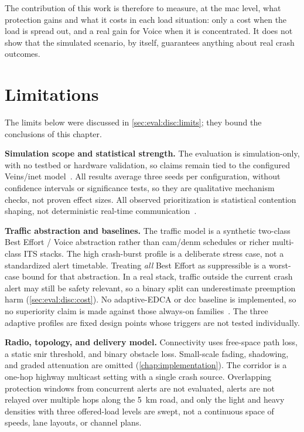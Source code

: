 The contribution of this work is therefore to measure, at the \gls{mac} level, what protection gains and what it costs in each load situation: only a cost when the load is spread out, and a real gain for Voice when it is concentrated.
It does not show that the simulated scenario, by itself, guarantees anything about real crash outcomes.

\section{Limitations}
\label{sec:conc:limits}

The limits below were discussed in \autoref{sec:eval:disc:limits}; they bound the conclusions of this chapter.

\noindent\textbf{Simulation scope and statistical strength.}
The evaluation is simulation-only, with no testbed or hardware validation, so claims remain tied to the configured Veins/\gls{inet} model~\cite{aguiar2026_veins_qos}.
All results average three seeds per configuration, without confidence intervals or significance tests, so they are qualitative mechanism checks, not proven effect sizes.
All observed prioritization is statistical contention shaping, not deterministic real-time communication~\cite{kosekszott2012What}.

\medskip
\noindent\textbf{Traffic abstraction and baselines.}
The traffic model is a synthetic two-class Best Effort / Voice abstraction rather than \gls{cam}/\gls{denm} schedules or richer multi-class ITS stacks.
The high crash-burst profile is a deliberate stress case, not a standardized alert timetable.
Treating \emph{all} Best Effort as suppressible is a worst-case bound for that abstraction.
In a real stack, traffic outside the current crash alert may still be safety relevant, so a binary split can underestimate preemption harm (\autoref{sec:eval:disc:cost}).
No adaptive-EDCA or \gls{dcc} baseline is implemented, so no superiority claim is made against those always-on families~\cite{etsi_dcc_2018,romdhani2003AdaptiveEDCF}.
The three adaptive profiles are fixed design points whose triggers are not tested individually.

\medskip
\noindent\textbf{Radio, topology, and delivery model.}
Connectivity uses free-space path loss, a static \gls{snir} threshold, and binary obstacle loss.
Small-scale fading, shadowing, and graded attenuation are omitted (\autoref{chap:implementation}).
The corridor is a one-hop highway multicast setting with a single crash source.
Overlapping protection windows from concurrent alerts are not evaluated, alerts are not relayed over multiple hops along the 5~km road, and only the light and heavy densities with three offered-load levels are swept, not a continuous space of speeds, lane layouts, or channel plans.

